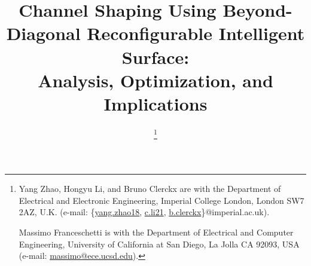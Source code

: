 \documentclass[journal]{IEEEtran}
\begin{document}
\title{Channel Shaping Using Beyond-Diagonal Reconfigurable Intelligent Surface:\\Analysis, Optimization, and Implications}
\author{
	\thanks{
		Yang Zhao, Hongyu Li, and Bruno Clerckx are with the Department of Electrical and Electronic Engineering, Imperial College London, London SW7 2AZ, U.K. (e-mail: \{\href{mailto:yang.zhao18@imperial.ac.uk}{yang.zhao18}, \href{mailto:c.li21@imperial.ac.uk}{c.li21}, \href{mailto:b.clerckx@imperial.ac.uk}{b.clerckx}\}@imperial.ac.uk).

		Massimo Franceschetti is with the Department of Electrical and Computer Engineering, University of California at San Diego, La Jolla CA 92093, USA (e-mail: \href{mailto:massimo@ece.ucsd.edu}{massimo@ece.ucsd.edu}).
	}
}
\maketitle
\end{document}
